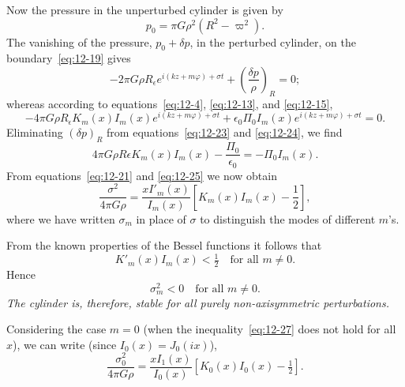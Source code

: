 Now the pressure in the unperturbed cylinder is given by
\begin{equation}
\label{eq:12-22}
p_0 = \pi G\rho^2(R^2 - \varpi^2).
\end{equation}
The vanishing of the pressure, $p_0 + \delta p$, in the perturbed cylinder, on the boundary~\eqref{eq:12-19} gives
\begin{equation}
\label{eq:12-23}
-2\pi G\rho R_\epsilon e^{i(kz+m\varphi)+\sigma t} + \left(\frac{\delta p}{\rho}\right)_R = 0;
\end{equation}
whereas according to equations~\eqref{eq:12-4}, \eqref{eq:12-13}, and \eqref{eq:12-15},
\begin{equation}
\label{eq:12-24}
-4\pi G\rho R_\epsilon K_m(x) I_m(x) e^{i(kz+m\varphi)+\sigma t} + \epsilon_0 \Pi_0 I_m(x) e^{i(kz+m\varphi)+\sigma t} = 0.
\end{equation}
Eliminating $(\delta p)_R$ from equations~\eqref{eq:12-23} and \eqref{eq:12-24}, we find
\begin{equation}
\label{eq:12-25}
4\pi G\rho R\epsilon K_m(x) I_m(x) - \frac{\Pi_0}{\epsilon_0} = -\Pi_0 I_m(x).
\end{equation}
From equations~\eqref{eq:12-21} and \eqref{eq:12-25} we now obtain
\begin{equation}
\label{eq:12-26}
\frac{\sigma^2}{4\pi G\rho} = \frac{x I'_m(x)}{I_m(x)} \left[ K_m(x) I_m(x) - \frac{1}{2} \right],
\end{equation}
where we have written $\sigma_m$ in place of $\sigma$ to distinguish the modes of different $m$'s.

From the known properties of the Bessel functions it follows that
\begin{equation}
\label{eq:12-27}
K'_m(x) I_m(x) < \tfrac{1}{2} \quad \text{for all } m \neq 0.
\end{equation}
Hence
\begin{equation}
\label{eq:12-28}
\sigma_m^2 < 0 \quad \text{for all } m \neq 0.
\end{equation}
\emph{The cylinder is, therefore, stable for all purely non-axisymmetric perturbations.}

Considering the case $m = 0$ (when the inequality~\eqref{eq:12-27} does not hold for all $x$), we can write (since $I_0(x) = J_0(ix)$),
\begin{equation}
\label{eq:12-29}
\frac{\sigma_0^2}{4\pi G\rho} = \frac{x I_1(x)}{I_0(x)} \left[ K_0(x) I_0(x) - \tfrac{1}{2} \right].
\end{equation}

